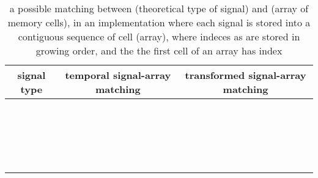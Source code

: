 \documentclass[a4paper,10pt]{article}
\begin{document}
\begin{table}[tb]
\caption{a possible matching between (theoretical type of signal) and (array of memory cells), in an implementation where each signal is stored into a contiguous sequence of cell (array), where indeces  as  are stored in growing order, and the the first cell of an array has index }
\label{tab:implementation}
\centering
\scalebox{0.9}
{
\begin{tabular}{ccc}
\toprule
signal type & temporal signal-array matching & transformed signal-array matching \\
\midrule
 &  &  \\
 &  &  \\
 &  &  \\
 &  &  \\
 &  &  \\
 &  &  \\
 &  &  \\
 &  &  \\
 &  &  \\
 &  &  \\
 &  &  \\
 &  &  \\
 &  &  \\
 &  &  \\
 &  &  \\
 &  &  \\
 &  &  \\
 &  &  \\
 &  &  \\
 &  &  \\
\bottomrule
\end{tabular}
}
\end{table}





\endgroup





















\end{document}
